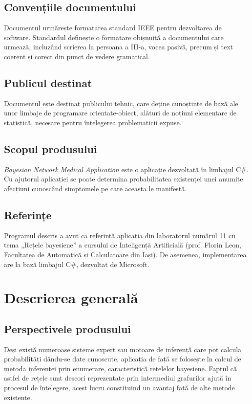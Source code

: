 \documentclass{scrreprt}
\begin{document}
\section{Convențiile documentului}
Documentul urmărește formatarea standard IEEE pentru dezvoltarea de software. Standardul definește o formatare obișnuită a documentului care urmează, incluzând scrierea la persoana a III-a, vocea pasivă, precum și text coerent și corect din punct de vedere gramatical.

\section{Publicul destinat}
Documentul este destinat publicului tehnic, care deține cunoștințe de bază ale unor limbaje de programare orientate-obiect, alături de noțiuni elementare de statistică, necesare pentru înțelegerea problematicii expuse.

\section{Scopul produsului}
\textit{Bayesian Network Medical Application} este o aplicație dezvoltată în limbajul C\#. Cu ajutorul aplicației se poate determina probabilitatea existenței unei anumite afecțiuni cunoscând simptomele pe care aceasta le manifestă.

\section{Referințe}
Programul descris a avut ca referință aplicația din laboratorul numărul 11 cu tema „Rețele bayesiene” a cursului de Inteligență Artificială (prof. Florin Leon, Facultatea de Automatică și Calculatoare din Iași). De asemenea, implementarea are la bază limbajul C\#, dezvoltat de Microsoft.

\chapter{Descrierea generală}

\section{Perspectivele produsului}
Deși există numeroase sisteme expert sau motoare de inferență care pot calcula probabilități dându-se date cunoscute, aplicația de față se folosește în calcul de metoda inferenței prin enumerare, caracteristică rețelelor bayesiene. Faptul că astfel de rețele sunt deseori reprezentate prin intermediul grafurilor ajută în procesul de înțelegere, acest lucru constituind un avantaj față de alte metode existente.\par
\end{document}
